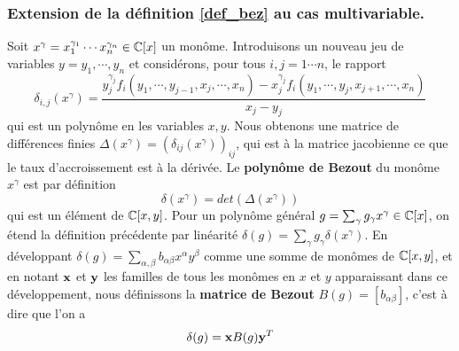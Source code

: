 \documentclass{standalone}
\begin{document}
  \subsubsection{Extension de la définition \ref{def_bez} au cas multivariable.}
  \label{def_bez_multi}

  \begin{defn}
  Soit $x^\gamma = x_1^{\gamma_1}\cdots x_n^{\gamma_n} \in \mathbb{C}[x]$ un monôme.
  Introduisons un nouveau jeu de variables $y = y_1,\cdots, y_n$ et considérons, pour tous $i, j = 1\cdots n$, le rapport
  \begin{equation}
  \label{finite_diff}
  \delta_{i,j}(x^\gamma) = \dfrac{y_j^{\gamma_j}f_i(y_1,\cdots, y_{j-1},x_j,\cdots,x_n) - x_j^{\gamma_j}f_i(y_1,\cdots,y_j,x_{j+1},\cdots,x_n)}{x_j - y_j}
  \end{equation}
  qui est un polynôme en les variables $x, y$. Nous obtenons une matrice de différences finies $\Delta(x^\gamma) = (\delta_{ij}(x^\gamma))_{ij}$, qui est à la matrice jacobienne ce que le taux d'accroissement est à la dérivée.
  Le {\bf polynôme de Bezout} du monôme $x^\gamma$ est par définition
  \begin{equation}
  	\delta(x^\gamma) = det(\Delta(x^\gamma))
  \end{equation}
  qui est un élément de $\mathbb{C}[x, y]$. Pour un polynôme général $g = \sum_\gamma g_\gamma x^\gamma \in \mathbb{C}[x]$, on étend la définition précédente par linéarité $\delta(g) = \sum_\gamma g_\gamma \delta(x^\gamma)$.
  En développant $\delta(g) = \sum_{\alpha,\beta} b_{\alpha\beta} x^\alpha y^\beta$ comme une somme de monômes de $\mathbb{C}[x, y]$, et en notant $\bold{x}$ et $\bold{y}$ les familles de tous les monômes en $x$ et $y$ apparaissant dans ce développement, nous définissons la {\bf matrice de Bezout} $B(g) = [b_{\alpha\beta}]$, c'est à dire que l'on a
  \begin{equation}
  	\delta(g) = \bold{x} B(g) \bold{y}^T
  \end{equation}
  \end{defn}
\end{document}
